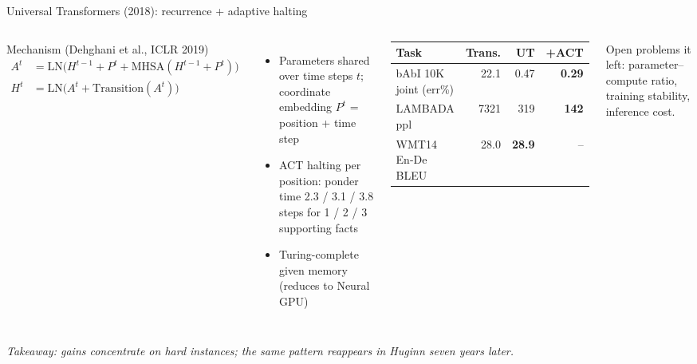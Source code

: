 \documentclass[aspectratio=169,10pt]{beamer}
\newcommand{\con}[1]{\textcolor{negative}{#1}}
\begin{document}
\begin{frame}{Universal Transformers (2018): recurrence + adaptive halting}
  \begin{columns}[T]
      \begin{block}{Mechanism (Dehghani et al., ICLR 2019)}
        \begin{align*}
          A^t &= \mathrm{LN}\!\big(H^{t-1}{+}P^t + \mathrm{MHSA}(H^{t-1}{+}P^t)\big)\\
          H^t &= \mathrm{LN}\!\big(A^t + \mathrm{Transition}(A^t)\big)
        \end{align*}
      \end{block}
      \begin{itemize}
        \item Parameters shared over time steps $t$; coordinate embedding $P^t$ = position + time step
        \item ACT halting per position: ponder time 2.3 / 3.1 / 3.8 steps for 1 / 2 / 3 supporting facts
        \item Turing-complete given memory (reduces to Neural GPU)
      \end{itemize}
      \vspace{4pt}
      \begin{center}
      \small
      \begin{tabular}{@{}lrrr@{}}
        \toprule
        Task & Trans. & UT & +ACT \\
        \midrule
        bAbI 10K joint (err\%) & 22.1 & 0.47 & \textbf{0.29} \\
        LAMBADA ppl & 7321 & 319 & \textbf{142} \\
        WMT14 En-De BLEU & 28.0 & \textbf{28.9} & -- \\
        \bottomrule
      \end{tabular}
      \end{center}
      \vspace{4pt}
      \con{Open problems it left:} parameter--compute ratio, training stability, inference cost.
  \end{columns}
  \vspace{4pt}
  \textit{Takeaway: gains concentrate on hard instances; the same pattern reappears in Huginn seven years later.}
\end{frame}
\end{document}
